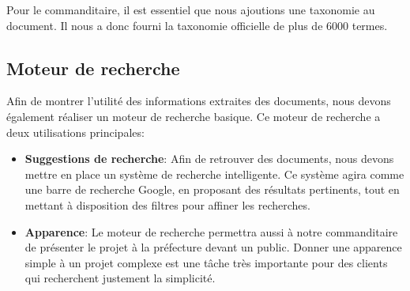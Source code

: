 Pour le commanditaire, il est essentiel que nous ajoutions une taxonomie au document.
Il nous a donc fourni la taxonomie officielle de plus de 6000 termes.


\subsection{Moteur de recherche}
Afin de montrer l'utilité des informations extraites des documents, nous devons également réaliser un moteur de recherche basique.
Ce moteur de recherche a deux utilisations principales: 
\begin{itemize}
\item \textbf{Suggestions de recherche}:\newline
Afin de retrouver des documents, nous devons mettre en place un système de recherche intelligente.
Ce système agira comme une barre de recherche Google, en proposant des résultats pertinents, tout en mettant à disposition des filtres pour affiner les recherches.

\item \textbf{Apparence}:\newline
Le moteur de recherche permettra aussi à notre commanditaire de présenter le projet à la préfecture devant un public.
Donner une apparence simple à un projet complexe est une tâche très importante pour des clients qui recherchent justement la simplicité.
\end{itemize}

